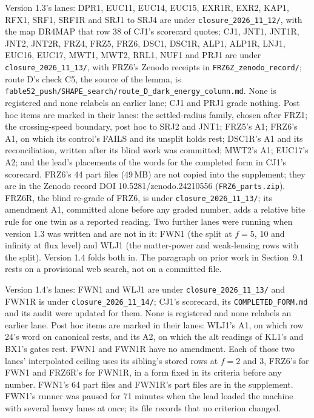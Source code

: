 \documentclass[10pt]{article}
\begin{document}
Version 1.3's lanes: DPR1, EUC11, EUC14, EUC15, EXR1R, EXR2, KAP1, RFX1, SRF1, SRF1R and SRJ1 to SRJ4 are under \texttt{closure\_2026\_11\_12/}, with the map DR4MAP that row 38 of CJ1's scorecard quotes; CJ1, JNT1, JNT1R, JNT2, JNT2R, FRZ4, FRZ5, FRZ6, DSC1, DSC1R, ALP1, ALP1R, LNJ1, EUC16, EUC17, MWT1, MWT2, RRL1, NUF1 and PRJ1 are under \texttt{closure\_2026\_11\_13/}, with FRZ6's Zenodo receipts in \texttt{FRZ6Z\_zenodo\_record/}; route D's check C5, the source of the lemma, is \texttt{fable52\_push/SHAPE\_search/route\_D\_dark\_energy\_column.md}. None is registered and none relabels an earlier lane; CJ1 and PRJ1 grade nothing. Post hoc items are marked in their lanes: the settled-radius family, chosen after FRZ1; the crossing-speed boundary, post hoc to SRJ2 and JNT1; FRZ5's A1; FRZ6's A1, on which its control's FAILS and its unsplit holds rest; DSC1R's A1 and its reconciliation, written after its blind work was committed; MWT2's A1; EUC17's A2; and the lead's placements of the words for the completed form in CJ1's scorecard. FRZ6's 44 part files (49\,MB) are not copied into the supplement; they are in the Zenodo record DOI 10.5281/zenodo.24210556 (\texttt{FRZ6\_parts.zip}). FRZ6R, the blind re-grade of FRZ6, is under \texttt{closure\_2026\_11\_13/}; its amendment A1, committed alone before any graded number, adds a relative bite rule for one twin as a reported reading. Two further lanes were running when version 1.3 was written and are not in it: FWN1 (the split at $f=5$, 10 and infinity at flux level) and WLJ1 (the matter-power and weak-lensing rows with the split). Version 1.4 folds both in. The paragraph on prior work in Section~9.1 rests on a provisional web search, not on a committed file.

Version 1.4's lanes: FWN1 and WLJ1 are under \texttt{closure\_2026\_11\_13/} and FWN1R is under \texttt{closure\_2026\_11\_14/}; CJ1's scorecard, its \texttt{COMPLETED\_FORM.md} and its audit were updated for them. None is registered and none relabels an earlier lane. Post hoc items are marked in their lanes: WLJ1's A1, on which row 24's word on canonical rests, and its A2, on which the alt readings of KL1's and BX1's gates rest. FWN1 and FWN1R have no amendment. Each of those two lanes' interpolated ceiling uses its sibling's stored rows at $f=2$ and 3, FRZ6's for FWN1 and FRZ6R's for FWN1R, in a form fixed in its criteria before any number. FWN1's 64 part files and FWN1R's part files are in the supplement. FWN1's runner was paused for 71 minutes when the lead loaded the machine with several heavy lanes at once; its file records that no criterion changed.
\end{document}
